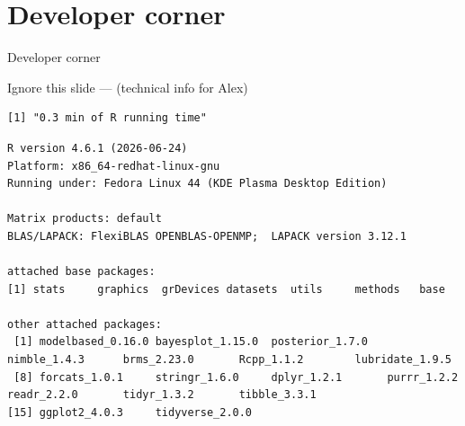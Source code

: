 \documentclass[
  10pt,
  ignorenonframetext,
  aspectratio=169,
  t]{beamer}
\begin{document}
\section*{Developer corner}\label{developer-corner}

\begin{frame}[c]{}
\protect{}\label{section-1}
\centering

\Large Developer corner
\end{frame}

\begin{frame}[fragile]{Ignore this slide --- (technical info for Alex)}
\protect{}\label{ignore-this-slide-technical-info-for-alex}
\tiny

\begin{verbatim}
[1] "0.3 min of R running time"
\end{verbatim}

\begin{verbatim}
R version 4.6.1 (2026-06-24)
Platform: x86_64-redhat-linux-gnu
Running under: Fedora Linux 44 (KDE Plasma Desktop Edition)

Matrix products: default
BLAS/LAPACK: FlexiBLAS OPENBLAS-OPENMP;  LAPACK version 3.12.1

attached base packages:
[1] stats     graphics  grDevices datasets  utils     methods   base     

other attached packages:
 [1] modelbased_0.16.0 bayesplot_1.15.0  posterior_1.7.0   nimble_1.4.3      brms_2.23.0       Rcpp_1.1.2        lubridate_1.9.5  
 [8] forcats_1.0.1     stringr_1.6.0     dplyr_1.2.1       purrr_1.2.2       readr_2.2.0       tidyr_1.3.2       tibble_3.3.1     
[15] ggplot2_4.0.3     tidyverse_2.0.0  


\end{verbatim}
\end{frame}
\end{document}
